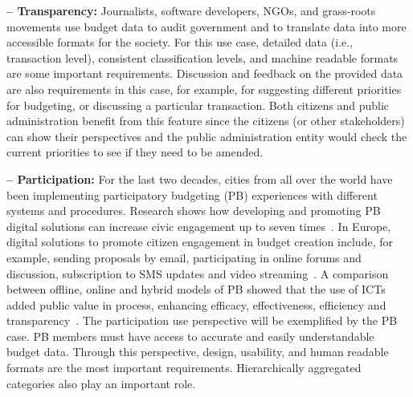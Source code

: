 \noindent\textbf{ -- Transparency:} Journalists, software developers, NGOs, and grass-roots movements use budget data to audit government and to translate data into more accessible formats for the society. For this use case, detailed data (i.e., transaction level), consistent classification levels, and machine readable formats are some important requirements.
Discussion and feedback on the provided data are also requirements in this case, for example, for suggesting different priorities for budgeting, or discussing a particular transaction. 
Both citizens and public administration benefit from this feature since the citizens (or other stakeholders) can show their perspectives and the public administration entity would check the current priorities to see if they need to be amended. 

\vspace{.1cm}

\noindent\textbf{ -- Participation:} 
For the last two decades, cities from all over the world have been implementing participatory budgeting (PB) experiences with different systems and procedures. Research shows how developing and promoting PB digital solutions can increase civic engagement up to seven times~\cite{Sintomer2008}. 
In Europe, digital solutions to promote citizen engagement in budget creation include, for example, sending proposals by email, participating in online forums and discussion, subscription to SMS updates and video streaming~\cite{Peixoto2009}. 
A comparison between offline, online and hybrid models of PB showed that the use of ICTs added public value in process, enhancing efficacy, effectiveness, efficiency and transparency~\cite{Mkude2014}. 
The participation use perspective will be exemplified by the PB case.
PB members must have access to accurate and easily understandable budget data. 
Through this perspective, design, usability, and human readable formats are the most important requirements.
Hierarchically aggregated categories also play an important role.

